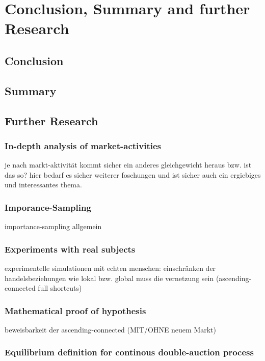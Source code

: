 \documentclass[Bachelorarbeit.tex]{subfiles}
\begin{document}
\chapter{Conclusion, Summary and further Research}

\section{Conclusion}

\section{Summary}

\section{Further Research}

\subsection{In-depth analysis of market-activities}
je nach markt-aktivität kommt sicher ein anderes gleichgewicht heraus bzw. ist das so?
hier bedarf es sicher weiterer foschungen und ist sicher auch ein ergiebiges und interessantes thema.

\subsection{Imporance-Sampling}
importance-sampling allgemein

\subsection{Experiments with real subjects}
experimentelle simulationen mit echten menschen: einschränken der handelsbeziehungen
wie lokal bzw. global muss die vernetzung sein (ascending-connected full shortcuts)

\subsection{Mathematical proof of hypothesis}
beweisbarkeit der ascending-connected (MIT/OHNE neuem Markt)

\subsection{Equilibrium definition for continous double-auction process}
\end{document}
